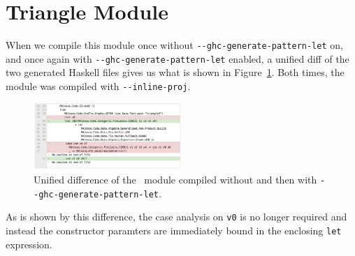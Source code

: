 


\section{Triangle Module}


When we compile this module once without \texttt{-{}-ghc-generate-pattern-let} on, and once again with \texttt{-{}-ghc-generate-pattern-let} enabled, a unified diff of the two generated Haskell files gives us what is shown in Figure~\ref{fig:Triangle_genplet}. Both times, the module was compiled with \texttt{-{}-inline-proj}.

\begin{figure}[h]
    \centering
    \includegraphics[width=0.5\textwidth]{Figures/Triangle_genplet}
    \caption{Unified difference of the ~module compiled without and then with \texttt{-{}-ghc-generate-pattern-let}.}
    \label{fig:Triangle_genplet}
\end{figure}

As is shown by this difference, the case analysis on \lstinline{v0} is no longer required and instead the constructor paramters are immediately bound in the enclosing \lstinline{let} expression.

